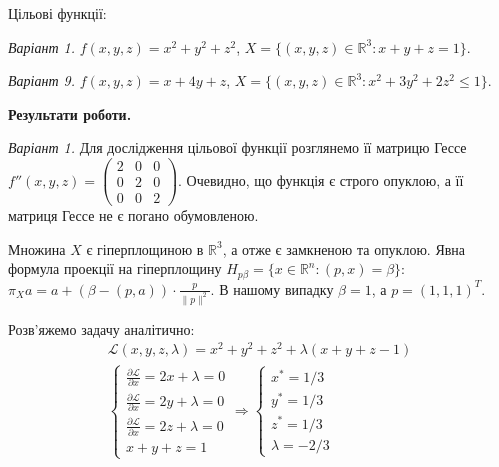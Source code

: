 \documentclass{extreport}
\begin{document}
Цільові функції:

\emph{Варіант 1.} $f(x, y, z) = x^2 + y^2 + z^2$, $X = \{ (x,y,z) \in \mathbb{R}^3 : x + y + z = 1 \}$.

\emph{Варіант 9.} $f(x, y, z) = x + 4y + z$, $X = \{ (x,y,z) \in \mathbb{R}^3 : x^2 + 3y^2 + 2z^2 \leq 1 \}$.

\noindent\textbf{Результати роботи.}

\emph{Варіант 1.}
Для дослідження цільової функції розглянемо її матрицю Гессе
$f''(x,y,z) = \begin{pmatrix}
    2 & 0 & 0 \\
    0 & 2 & 0 \\
    0 & 0 & 2
\end{pmatrix}$. Очевидно, що функція є строго опуклою,
а її матриця Гессе не є погано обумовленою.

Множина $X$ є гіперплощиною в $\mathbb{R}^3$, а отже є замкненою та опуклою.
Явна формула проекції на гіперплощину
$H_{p\beta} = \{x \in \mathbb{R}^n : (p,x)=\beta\}$:
$\pi_X a = a + (\beta - (p,a))\cdot \frac{p}{\|p\|^2}$.
В нашому випадку $\beta = 1$, а $p=(1,1,1)^T$.

Розв'яжемо задачу аналітично:
\begin{gather*}
    \mathcal{L}(x, y, z, \lambda) = x^2 + y^2 + z^2 + \lambda(x+y+z-1) \\
    \begin{cases}
        \frac{\partial \mathcal{L}}{\partial x} = 2x + \lambda = 0 \\
        \frac{\partial \mathcal{L}}{\partial x} = 2y + \lambda = 0 \\
        \frac{\partial \mathcal{L}}{\partial x} = 2z + \lambda = 0 \\
        x + y + z = 1
    \end{cases} \Rightarrow
    \begin{cases}
        x^* = 1/3 \\
        y^* = 1/3 \\
        z^* = 1/3 \\
        \lambda = -2/3
    \end{cases}
\end{gather*}
\end{document}
